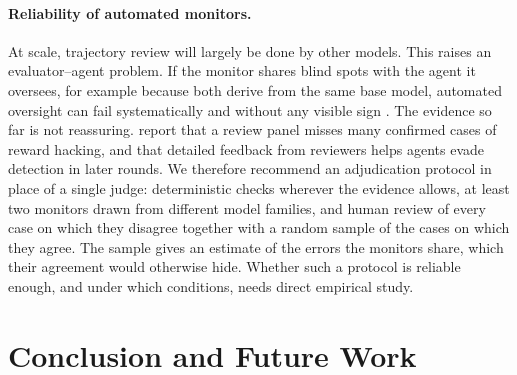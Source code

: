 \documentclass{article}
\begin{document}
\paragraph{Reliability of automated monitors.}
At scale, trajectory review will largely be done by other models. This raises an evaluator--agent problem. If the monitor shares blind spots with the agent it oversees, for example because both derive from the same base model, automated oversight can fail systematically and without any visible sign \citep{panickssery2024llm,greenblatt2024control}. The evidence so far is not reassuring. \citet{huang2026reward} report that a review panel misses many confirmed cases of reward hacking, and that detailed feedback from reviewers helps agents evade detection in later rounds. We therefore recommend an adjudication protocol in place of a single judge: deterministic checks wherever the evidence allows, at least two monitors drawn from different model families, and human review of every case on which they disagree together with a random sample of the cases on which they agree. The sample gives an estimate of the errors the monitors share, which their agreement would otherwise hide. Whether such a protocol is reliable enough, and under which conditions, needs direct empirical study.

\section{Conclusion and Future Work}
\label{sec:conclusion}
\end{document}
